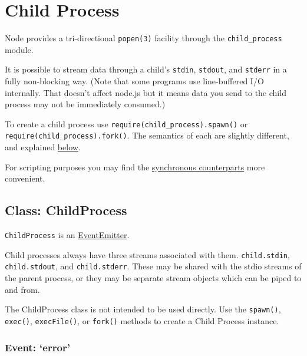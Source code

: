 \section{Child Process}\label{child-process}

\begin{Shaded}
\begin{Highlighting}[]
 
\end{Highlighting}
\end{Shaded}

Node provides a tri-directional \texttt{popen(3)} facility through the
\texttt{child\_process} module.

It is possible to stream data through a child's \texttt{stdin},
\texttt{stdout}, and \texttt{stderr} in a fully non-blocking way. (Note
that some programs use line-buffered I/O internally. That doesn't affect
node.js but it means data you send to the child process may not be
immediately consumed.)

To create a child process use
\texttt{require(\textquotesingle{}child\_process\textquotesingle{}).spawn()}
or
\texttt{require(\textquotesingle{}child\_process\textquotesingle{}).fork()}.
The semantics of each are slightly different, and explained
\hyperref[childux5fprocessux5fasynchronousux5fprocessux5fcreation]{below}.

For scripting purposes you may find the
\hyperref[childux5fprocessux5fsynchronousux5fprocessux5fcreation]{synchronous
counterparts} more convenient.

\subsection{Class: ChildProcess}\label{class-childprocess}

\texttt{ChildProcess} is an
\href{events.html\#events_class_events_eventemitter}{EventEmitter}.

Child processes always have three streams associated with them.
\texttt{child.stdin}, \texttt{child.stdout}, and \texttt{child.stderr}.
These may be shared with the stdio streams of the parent process, or
they may be separate stream objects which can be piped to and from.

The ChildProcess class is not intended to be used directly. Use the
\texttt{spawn()}, \texttt{exec()}, \texttt{execFile()}, or
\texttt{fork()} methods to create a Child Process instance.

\subsubsection{\texorpdfstring{Event:
`error'}{Event: error}}\label{event-error}

